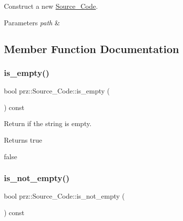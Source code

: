 Construct a new \mbox{\hyperlink{classprz_1_1_source___code}{Source\+\_\+\+Code}}. 


\begin{DoxyParams}{Parameters}
{\em path} & \\
\hline
\end{DoxyParams}


\subsection{Member Function Documentation}
\mbox{\label{classprz_1_1_source___code_ac815747839c11050fac39b7ee397e22b}} 
\subsubsection{\texorpdfstring{is\_empty()}{is\_empty()}}
{\footnotesize\ttfamily bool prz\+::\+Source\+\_\+\+Code\+::is\+\_\+empty (\begin{DoxyParamCaption}{ }\end{DoxyParamCaption}) const\hspace{0.3cm}{\ttfamily [inline]}}



Return if the string is empty. 

\begin{DoxyReturn}{Returns}
true 

false 
\end{DoxyReturn}
\mbox{\label{classprz_1_1_source___code_aee6d2b87ef6e65d51f4041badfe3d6b9}} 
\subsubsection{\texorpdfstring{is\_not\_empty()}{is\_not\_empty()}}
{\footnotesize\ttfamily bool prz\+::\+Source\+\_\+\+Code\+::is\+\_\+not\+\_\+empty (\begin{DoxyParamCaption}{ }\end{DoxyParamCaption}) const\hspace{0.3cm}{\ttfamily [inline]}}



